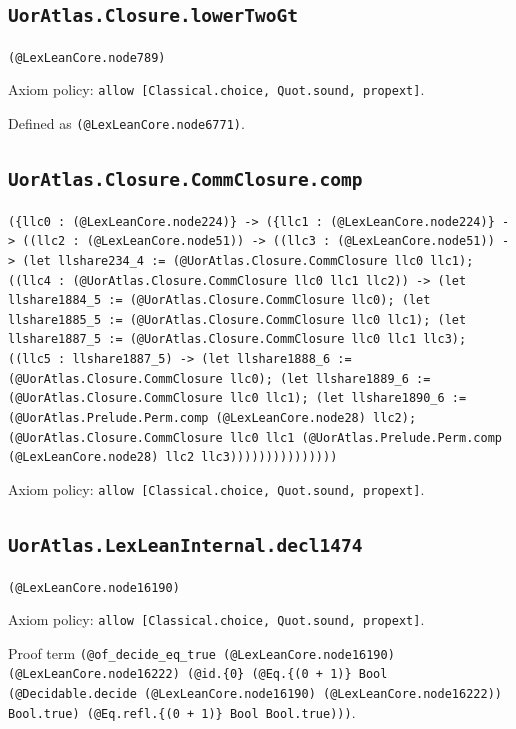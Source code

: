 \documentclass[11pt]{article}
\begin{document}
\subsection*{\texttt{UorAtlas.Closure.lowerTwoGt}}
\noindent\texttt{(@LexLeanCore.node789)}\par
\noindent Axiom policy: \texttt{allow [Classical.choice, Quot.sound, propext]}.\par
\noindent Defined as \texttt{(@LexLeanCore.node6771)}.\par
\subsection*{\texttt{UorAtlas.Closure.CommClosure.comp}}
\noindent\texttt{(\{llc0 : (@LexLeanCore.node224)\} -> (\{llc1 : (@LexLeanCore.node224)\} -> ((llc2 : (@LexLeanCore.node51)) -> ((llc3 : (@LexLeanCore.node51)) -> (let llshare234\_4 := (@UorAtlas.Closure.CommClosure llc0 llc1); ((llc4 : (@UorAtlas.Closure.CommClosure llc0 llc1 llc2)) -> (let llshare1884\_5 := (@UorAtlas.Closure.CommClosure llc0); (let llshare1885\_5 := (@UorAtlas.Closure.CommClosure llc0 llc1); (let llshare1887\_5 := (@UorAtlas.Closure.CommClosure llc0 llc1 llc3); ((llc5 : llshare1887\_5) -> (let llshare1888\_6 := (@UorAtlas.Closure.CommClosure llc0); (let llshare1889\_6 := (@UorAtlas.Closure.CommClosure llc0 llc1); (let llshare1890\_6 := (@UorAtlas.Prelude.Perm.comp (@LexLeanCore.node28) llc2); (@UorAtlas.Closure.CommClosure llc0 llc1 (@UorAtlas.Prelude.Perm.comp (@LexLeanCore.node28) llc2 llc3)))))))))))))))}\par
\noindent Axiom policy: \texttt{allow [Classical.choice, Quot.sound, propext]}.\par
\subsection*{\texttt{UorAtlas.LexLeanInternal.decl1474}}
\noindent\texttt{(@LexLeanCore.node16190)}\par
\noindent Axiom policy: \texttt{allow [Classical.choice, Quot.sound, propext]}.\par
\noindent Proof term \texttt{(@of\_decide\_eq\_true (@LexLeanCore.node16190) (@LexLeanCore.node16222) (@id.\{0\} (@Eq.\{(0 + 1)\} Bool (@Decidable.decide (@LexLeanCore.node16190) (@LexLeanCore.node16222)) Bool.true) (@Eq.refl.\{(0 + 1)\} Bool Bool.true)))}.\par
\end{document}

